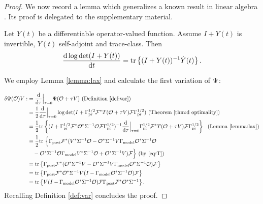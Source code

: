 \begin{proof}
  We now record a lemma which generalizes a known result in linear
  algebra \cite[Chapter 9, Theorem 4]{Lax07}. Its proof is delegated
  to the supplementary material.
  \begin{lemma}\label{lemma:lax}
    Let $Y(t)$ be a differentiable operator-valued function. Assume 
    $I+Y(t)$ is invertible, $Y(t)$ self-adjoint and trace-class. Then
    \begin{equation*}
      \frac{\der \log \det (I+Y(t))}{\der t} = \tr{(I+Y(t))^{-1} \dot{Y}(t)}.
    \end{equation*}
  \end{lemma}
  
  We employ Lemma \ref{lemma:lax} and calculate the first variation of
  $\Psi$:

  \begin{align*}
      \delta \tar(\obs) V 
      :&= \frac{\der}{\der\tau} \Big |_{\tau=0} \tar(\obs + \tau V) \text{ (Definition \ref{def:var})}\\
      &= \frac12 \frac{\der}{\der \tau} \Big |_{\tau=0} \log \det 
      (I + \prcov^{1/2} \fwd^* T(\obs+\tau V)\fwd \prcov^{1/2} ) \text{ (Theorem \ref{thm:d optimality})} \\
      &= \frac12 \tr{( I + \prcov^{1/2} \fwd^* \obs^* \Sigma^{-1}
        \obs\fwd \prcov^{1/2} )^{-1}
        \frac{\der}{\der \tau} \Big |_{\tau=0}
        \prcov^{1/2} \fwd^* T(\obs+\tau V) \fwd \prcov^{1/2}}\ \text{ (Lemma \ref{lemma:lax})} \\
      &= \frac12 \ttr\Big \{ \postcov \fwd^* (V^* \Sigma^{-1} \obs 
      - \obs^*\Sigma^{-1} V\modcov \obs^* \Sigma^{-1}\obs \\
      &\ \ \ - \obs^* \Sigma^{-1} \obs \modcov V^* \Sigma^{-1}\obs 
      + \obs^* \Sigma^{-1} V ) \fwd \Big \}  \text{ (by \eqref{eq:T})} \\
      &= \tr{\postcov \fwd^* ( \obs^* \Sigma^{-1} V -
      \obs^*\Sigma^{-1} V\modcov \obs^* \Sigma^{-1}\obs ) \fwd} \\
      &= \tr{\postcov \fwd^* \obs^* \Sigma^{-1} V 
      ( I - \modcov \obs^* \Sigma^{-1}\obs ) \fwd} \\
      &= \tr{V ( I - \modcov \obs^* \Sigma^{-1}\obs )
      \fwd \postcov \fwd^* \obs^* \Sigma^{-1}}.
  \end{align*} 
  Recalling Definition \ref{def:var} concludes the proof.
\end{proof}

